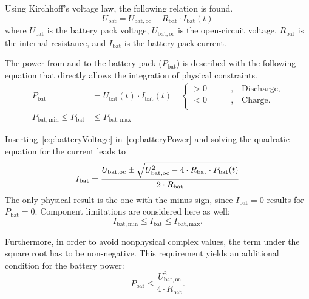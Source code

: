 Using Kirchhoff's voltage law, the following relation is found.
\begin{equation}
	U_\mathrm{bat} = U_\mathrm{bat,oc} - R_\mathrm{bat} \cdot I_\mathrm{bat}(t) \label{eq:batteryVoltage}
\end{equation}
where $U_\mathrm{bat}$ is the battery pack voltage, $U_\mathrm{bat,oc}$ is the open-circuit voltage, $R_\mathrm{bat}$ is the internal resistance, and $I_\mathrm{bat}$ is the battery pack current.

The power from and to the battery pack ($P_\mathrm{bat}$) is described with the following equation that directly allows the integration of physical constraints.
\begin{align}
	P_\mathrm{bat} &= U_\mathrm{bat}(t) \cdot I_\mathrm{bat}(t) \quad
	\begin{cases}
		> 0 \qquad & , \quad \text{Discharge,} \\
		< 0 \qquad & , \quad \text{Charge.} \\
	\end{cases} \label{eq:batteryPower} \\
	P_\mathrm{bat,min} \leq P_\mathrm{bat} &\leq P_\mathrm{bat,max}
\end{align}

Inserting~\cref{eq:batteryVoltage} in~\cref{eq:batteryPower} and solving the quadratic equation for the current leads to
\begin{equation}
	I_\mathrm{bat} = \frac{U_\mathrm{bat,oc} \pm \sqrt{U_\mathrm{bat,oc}^2 - 4 \cdot R_\mathrm{bat} \cdot P_\mathrm{bat}(t)}}{2 \cdot R_\mathrm{bat}} \\
\end{equation}
The only physical result is the one with the minus sign, since $I_\mathrm{bat} = 0$ results for $P_\mathrm{bat} = 0$. Component limitations are considered here as well:
\begin{equation}
	I_\mathrm{bat,min} \leq I_\mathrm{bat} \leq I_\mathrm{bat,max}.
\end{equation}

Furthermore, in order to avoid nonphysical complex values, the term under the square root has to be non-negative. This requirement yields an additional condition for the battery power:
\begin{equation}
	P_\mathrm{bat} \leq \frac{U_\mathrm{bat,oc}^2}{4 \cdot R_\mathrm{bat}}. \label{eq:modelBatLimitSQRT}
\end{equation}

